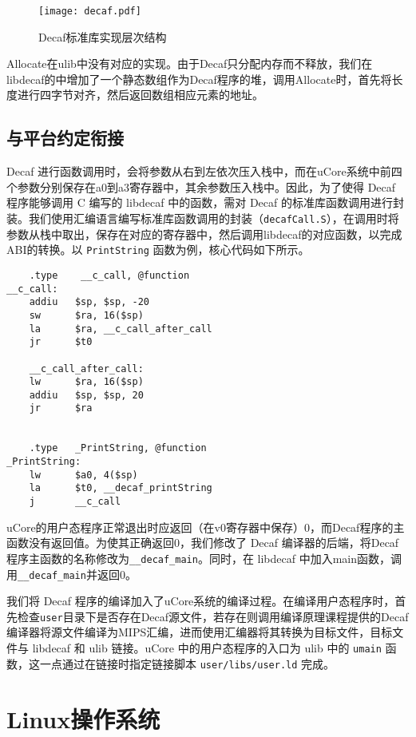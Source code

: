 \begin{figure}[htbp]
    \centering
    \texttt{[image: decaf.pdf]}
    \caption{Decaf标准库实现层次结构}
    \label{figure:libdecaf}
\end{figure}

Allocate在ulib中没有对应的实现。由于Decaf只分配内存而不释放，我们在libdecaf的中增加了一个静态数组作为Decaf程序的堆，调用Allocate时，首先将长度进行四字节对齐，然后返回数组相应元素的地址。

\subsection{与平台约定衔接}
Decaf 进行函数调用时，会将参数从右到左依次压入栈中，而在uCore系统中前四个参数分别保存在a0到a3寄存器中，其余参数压入栈中。因此，为了使得 Decaf 程序能够调用 C 编写的 libdecaf 中的函数，需对 Decaf 的标准库函数调用进行封装。我们使用汇编语言编写标准库函数调用的封装（\texttt{decafCall.S}），在调用时将参数从栈中取出，保存在对应的寄存器中，然后调用libdecaf的对应函数，以完成ABI的转换。以 \texttt{PrintString} 函数为例，核心代码如下所示。

\begin{verbatim}
    .type    __c_call, @function
__c_call:
    addiu   $sp, $sp, -20
    sw      $ra, 16($sp)
    la      $ra, __c_call_after_call
    jr      $t0

    __c_call_after_call:
    lw      $ra, 16($sp)
    addiu   $sp, $sp, 20
    jr      $ra


    .type   _PrintString, @function
_PrintString:
    lw      $a0, 4($sp)
    la      $t0, __decaf_printString
    j       __c_call
\end{verbatim}

uCore的用户态程序正常退出时应返回（在v0寄存器中保存）0，而Decaf程序的主函数没有返回值。为使其正确返回0，我们修改了 Decaf 编译器的后端，将Decaf程序主函数的名称修改为\texttt{\_\_decaf\_main}。同时，在 libdecaf 中加入main函数，调用\texttt{\_\_decaf\_main}并返回0。

我们将 Decaf 程序的编译加入了uCore系统的编译过程。在编译用户态程序时，首先检查\texttt{user}目录下是否存在Decaf源文件，若存在则调用编译原理课程提供的Decaf编译器将源文件编译为MIPS汇编，进而使用汇编器将其转换为目标文件，目标文件与 libdecaf 和 ulib 链接。uCore 中的用户态程序的入口为 ulib 中的 \texttt{umain} 函数，这一点通过在链接时指定链接脚本 \texttt{user/libs/user.ld} 完成。

\section{Linux操作系统}

